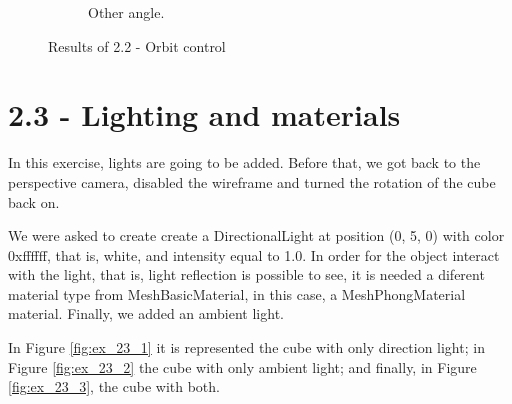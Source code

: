 \documentclass[12pt]{article}
\begin{document}
\begin{figure}[!h]
\begin{subfigure}{.5\textwidth}
        \caption{Other angle.}
        \label{fig:ex_22_2}
    \end{subfigure}
\caption{Results of 2.2 - Orbit control}
\label{fig:ex_22}
\end{figure}

\section*{2.3 - Lighting and materials}
\label{ex_23}

In this exercise, lights are going to be added. Before that, we got back to the perspective camera, disabled the wireframe and turned the rotation of the cube back on.\par

We were asked to create create a DirectionalLight at position (0, 5, 0) with color 0xffffff, that is, white, and intensity equal to 1.0.\newline
In order for the object interact with the light, that is, light reflection is possible to see, it is needed a diferent material type from MeshBasicMaterial, in this case, a MeshPhongMaterial material. Finally, we added an ambient light.\par

In Figure \ref{fig:ex_23_1} it is represented the cube with only direction light; in Figure \ref{fig:ex_23_2} the cube with only ambient light; and finally, in Figure \ref{fig:ex_23_3}, the cube with both.
\end{document}
